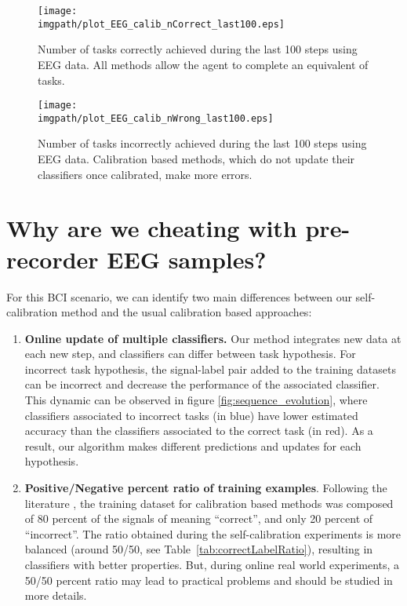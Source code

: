 \begin{figure}[!htbp]
\centering
\texttt{[image: \\imgpath/plot\_EEG\_calib\_nCorrect\_last100.eps]}
\caption{Number of tasks correctly achieved during the last 100 steps using EEG data. All methods allow the agent to complete an equivalent of tasks.}
\label{fig:nCorrectEEG_last100}
\end{figure} 

\begin{figure}[!htbp]
\centering
\texttt{[image: \\imgpath/plot\_EEG\_calib\_nWrong\_last100.eps]}
\caption{Number of tasks incorrectly achieved during the last 100 steps using EEG data. Calibration based methods, which do not update their classifiers once calibrated, make more errors.}
\label{fig:nWrongEEG_last100}
\end{figure} 

\section{Why are we cheating with pre-recorder EEG samples?}
\label{chapter:bci:cheating}

For this BCI scenario, we can identify two main differences between our self-calibration method and the usual calibration based approaches:
\begin{enumerate}
\item \textbf{Online update of multiple classifiers.} Our method integrates new data at each new step, and classifiers can differ between task hypothesis. For incorrect task hypothesis, the signal-label pair added to the training datasets can be incorrect and decrease the performance of the associated classifier. This dynamic can be observed in figure \ref{fig:sequence_evolution}, where classifiers associated to incorrect tasks (in blue) have lower estimated accuracy than the classifiers associated to the correct task (in red). As a result, our algorithm makes different predictions and updates for each hypothesis.
\item \textbf{Positive/Negative percent ratio of training examples}. Following the literature \cite{chavarriaga2010learning, iturrate2013task}, the training dataset for calibration based methods was composed of 80 percent of the signals of meaning ``correct'', and only 20 percent of ``incorrect''. The ratio obtained during the self-calibration experiments is more balanced (around 50/50, see Table~\ref{tab:correctLabelRatio}), resulting in classifiers with better properties. But, during online real world experiments, a 50/50 percent ratio may lead to practical problems and should be studied in more details.
\end{enumerate}

